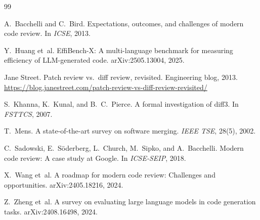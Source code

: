 \documentclass[
  11pt,
  a4paper,
  oneside,
  numbers=noenddot,
  abstract=true,
  headings=normal,
  DIV=11,
  BCOR=0mm,
]{scrartcl}
\theoremstyle{definition}
\theoremstyle{plain}
\theoremstyle{remark}
\begin{document}
\begin{thebibliography}{99}

A.~Bacchelli and C.~Bird.
\newblock Expectations, outcomes, and challenges of modern code review.
\newblock In \emph{ICSE}, 2013.

Y.~Huang et~al.
\newblock EffiBench-X: A multi-language benchmark for measuring efficiency of
LLM-generated code.
\newblock arXiv:2505.13004, 2025.

Jane Street.
\newblock Patch review vs.\ diff review, revisited.
\newblock Engineering blog, 2013.
\newblock \url{https://blog.janestreet.com/patch-review-vs-diff-review-revisited/}

S.~Khanna, K.~Kunal, and B.~C.~Pierce.
\newblock A formal investigation of diff3.
\newblock In \emph{FSTTCS}, 2007.

T.~Mens.
\newblock A state-of-the-art survey on software merging.
\newblock \emph{IEEE TSE}, 28(5), 2002.

C.~Sadowski, E.~S{\"o}derberg, L.~Church, M.~Sipko, and A.~Bacchelli.
\newblock Modern code review: A case study at Google.
\newblock In \emph{ICSE-SEIP}, 2018.

X.~Wang et~al.
\newblock A roadmap for modern code review: Challenges and opportunities.
\newblock arXiv:2405.18216, 2024.

Z.~Zheng et~al.
\newblock A survey on evaluating large language models in code generation tasks.
\newblock arXiv:2408.16498, 2024.

\end{thebibliography}
\end{document}
